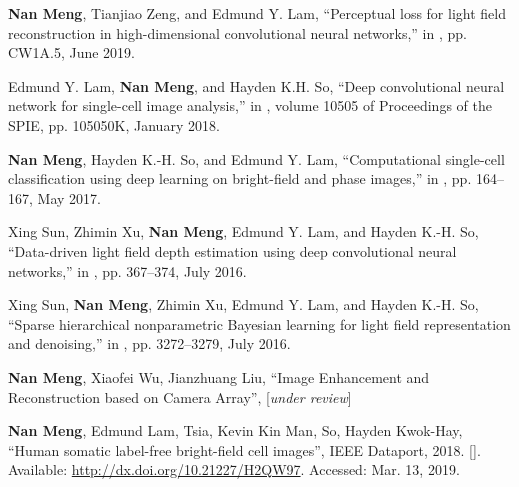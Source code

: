 \begin{publications}
\begin{conferences}
\item \textbf{Nan Meng}, Tianjiao Zeng, and Edmund Y. Lam, ``Perceptual loss for light field reconstruction in high-dimensional convolutional neural networks,'' in , pp. CW1A.5, June 2019.

\item Edmund Y. Lam, \textbf{Nan Meng}, and Hayden K.H. So, ``Deep convolutional neural network for single-cell image analysis,'' in , volume 10505 of Proceedings of the SPIE, pp. 105050K, January 2018.

\item \textbf{Nan Meng}, Hayden K.-H. So, and Edmund Y. Lam, ``Computational single-cell classification using deep learning on bright-field and phase images,'' in , pp. 164–167, May 2017.

\item Xing Sun, Zhimin Xu, \textbf{Nan Meng}, Edmund Y. Lam, and Hayden K.-H. So, ``Data-driven light field depth estimation using deep convolutional neural networks,'' in , pp. 367–374, July 2016.

\item Xing Sun, \textbf{Nan Meng}, Zhimin Xu, Edmund Y. Lam, and Hayden K.-H. So, ``Sparse hierarchical nonparametric Bayesian learning for light field representation and denoising,'' in , pp. 3272–3279, July 2016.
\end{conferences}

\begin{patents}
\item \textbf{Nan Meng}, Xiaofei Wu, Jianzhuang Liu, ``Image Enhancement and Reconstruction based on Camera Array'', [\emph{under review}]
\end{patents}

\begin{datasets}
\item \textbf{Nan Meng}, Edmund Lam, Tsia, Kevin Kin Man, So, Hayden Kwok-Hay, ``Human somatic label-free bright-field cell images'', IEEE Dataport, 2018. []. Available: \url{http://dx.doi.org/10.21227/H2QW97}. Accessed: Mar. 13, 2019.
\end{datasets}

\end{publications}